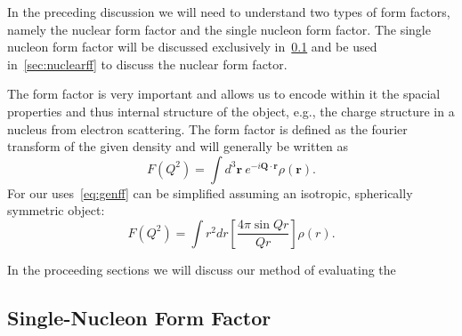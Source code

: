 In the preceding discussion we will need to understand two types of form factors, namely the nuclear form factor and the single nucleon form factor. The single nucleon form factor will be discussed exclusively in~\ref{sec:nucleonff} and be used  in~\ref{sec:nuclearff} to discuss the nuclear form factor. 

The form factor is very important and allows us to encode within it the spacial properties and thus internal structure of the object, e.g., the charge structure in a nucleus from electron scattering. The form factor is defined as the fourier transform of the given density and will generally be written as
\begin{equation}\label{eq:genff}
F(Q^2)=\int d^3\mathbf{r}\ e^{-i\mathbf{Q\cdot r}}\rho(\mathbf{r}).
\end{equation}
For our uses~\eqref{eq:genff} can be simplified assuming an isotropic, spherically symmetric object: 
\begin{equation}
F(Q^2)=\int r^2 dr\left[ \frac{4\pi \sin Qr}{Qr}\right] \rho(r).
\end{equation}
 
In the proceeding sections we will discuss our method of evaluating the 
\subsection{Single-Nucleon Form Factor}
\label{sec:nucleonff}

